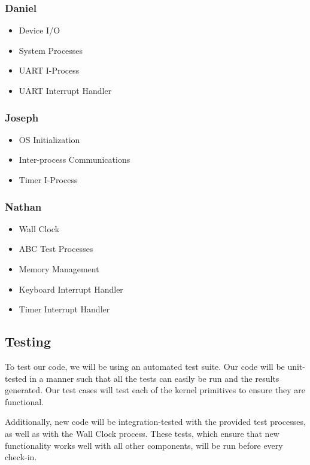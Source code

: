\documentclass[titlepage]{article}
\begin{document}
\subsubsection{Daniel}
\begin{itemize}
\setlength{\itemsep}{-1mm}
\item Device I/O
\item System Processes
\item UART I-Process
\item UART Interrupt Handler
\end{itemize}

\subsubsection{Joseph}
\begin{itemize}
\setlength{\itemsep}{-1mm}
\item OS Initialization
\item Inter-process Communications
\item Timer I-Process
\end{itemize}

\subsubsection{Nathan}
\begin{itemize}
\setlength{\itemsep}{-1mm}
\item Wall Clock
\item ABC Test Processes
\item Memory Management
\item Keyboard Interrupt Handler
\item Timer Interrupt Handler
\end{itemize}

\subsection{Testing}
To test our code, we will be using an automated test suite.  Our code will be
unit-tested in a manner such that all the tests can easily be run
and the results generated.  Our test cases will test each of the kernel
primitives to ensure they are functional.

Additionally, new code will be integration-tested with the provided test
processes, as well as with the Wall Clock process.  These tests, which ensure
that new functionality works well with all other components, will be run before
every check-in.
\end{document}
